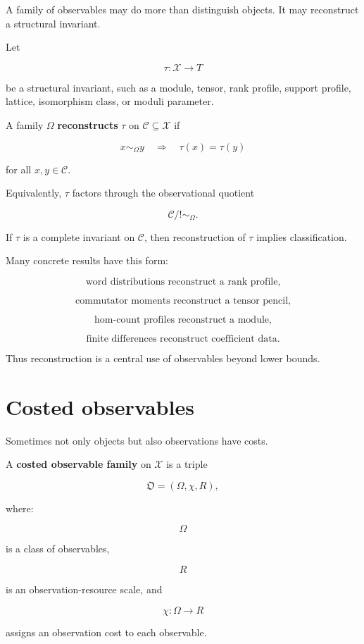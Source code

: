 \documentclass[11pt]{article}
\begin{document}
A family of observables may do more than distinguish objects. It may reconstruct a structural invariant.

Let

\[
\tau:\mathcal X\to T
\]

be a structural invariant, such as a module, tensor, rank profile, support profile, lattice, isomorphism class, or moduli parameter.

A family \(\Omega\) \textbf{reconstructs} \(\tau\) on \(\mathcal C\subseteq\mathcal X\) if

\[
x\sim_\Omega y
\quad\Longrightarrow\quad
\tau(x)=\tau(y)
\]

for all \(x,y\in\mathcal C\).

Equivalently, \(\tau\) factors through the observational quotient

\[
\mathcal C/!\sim_\Omega.
\]

If \(\tau\) is a complete invariant on \(\mathcal C\), then reconstruction of \(\tau\) implies classification.

Many concrete results have this form:

\[
\text{word distributions reconstruct a rank profile,}
\]

\[
\text{commutator moments reconstruct a tensor pencil,}
\]

\[
\text{hom-count profiles reconstruct a module,}
\]

\[
\text{finite differences reconstruct coefficient data.}
\]

Thus reconstruction is a central use of observables beyond lower bounds.


\section{Costed observables}

Sometimes not only objects but also observations have costs.

A \textbf{costed observable family} on \(\mathcal X\) is a triple

\[
\mathfrak O=(\Omega,\chi,R),
\]

where:

\[
\Omega
\]

is a class of observables,

\[
R
\]

is an observation-resource scale, and

\[
\chi:\Omega\to R
\]

assigns an observation cost to each observable.
\end{document}

